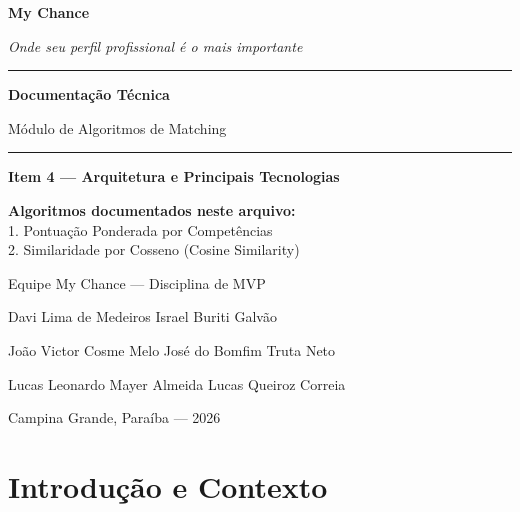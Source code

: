 \documentclass[12pt,a4paper]{article}
\begin{document}
\begin{titlepage}
  \centering
  \vspace*{2cm}
  {\Huge\bfseries\color{myblue} My Chance\par}
  \vspace{0.3cm}
  {\large\itshape Onde seu perfil profissional é o mais importante\par}
  \vspace{1.5cm}
  \rule{\linewidth}{1.5pt}
  \vspace{0.3cm}
  {\LARGE\bfseries Documentação Técnica\par}
  \vspace{0.2cm}
  {\Large\color{myblue!70!black} Módulo de Algoritmos de Matching\par}
  \vspace{0.2cm}
  \rule{\linewidth}{1.5pt}
  \vspace{1.2cm}
  {\large \textbf{Item 4 — Arquitetura e Principais Tecnologias}\par}
  \vspace{1cm}
  \begin{tcolorbox}[colback=myblue!8, colframe=myblue, width=0.85\linewidth]
    \centering
    \textbf{Algoritmos documentados neste arquivo:}\\[6pt]
    1. Pontuação Ponderada por Competências\\
    2. Similaridade por Cosseno (Cosine Similarity)
  \end{tcolorbox}
  \vspace{1.5cm}
  {\large Equipe My Chance — Disciplina de MVP\par}
  \vspace{0.4cm}
  {\normalsize Davi Lima de Medeiros \quad Israel Buriti Galvão\par}
  {\normalsize João Victor Cosme Melo \quad José do Bomfim Truta Neto\par}
  {\normalsize Lucas Leonardo Mayer Almeida \quad Lucas Queiroz Correia\par}
  \vfill
  {\normalsize Campina Grande, Paraíba — 2026\par}
\end{titlepage}

\tableofcontents
\newpage

\section{Introdução e Contexto}
\end{document}
